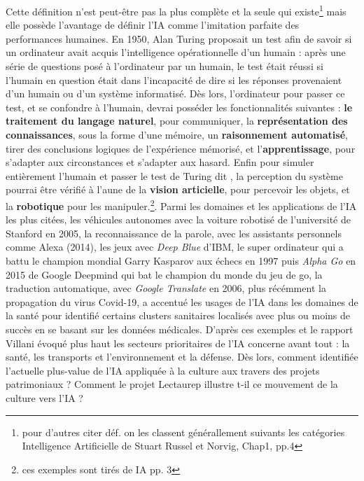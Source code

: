 Cette définition n'est peut-être pas la plus complète et la seule qui existe\footnote{ pour d'autres citer déf. on les classent générallement suivants les catégories Intelligence Artificielle de Stuart Russel et Norvig, Chap1, pp.4} mais elle possède l'avantage de définir l'IA comme l'imitation parfaite des performances humaines. En 1950, Alan Turing proposait un test afin de savoir si un ordinateur avait acquis l'intelligence opérationnelle d'un humain : après une série de questions posé à l'ordinateur par un humain, le test était réussi si l'humain en question était dans l'incapacité de dire si les réponses provenaient d'un humain ou d'un système informatisé. Dès lors, l'ordinateur pour passer ce test, et se confondre à l'humain, devrai posséder les fonctionnalités suivantes : \textbf{le traitement du langage naturel}, pour communiquer, la \textbf{représentation des connaissances}, sous la forme d'une mémoire, un \textbf{raisonnement automatisé}, tirer des conclusions logiques de l'expérience mémorisé, et l'\textbf{apprentissage}, pour s'adapter aux circonstances et s'adapter aux hasard. Enfin pour simuler entièrement l'humain et passer le test de Turing dit , la perception du système pourrai être vérifié à l'aune de la \textbf{vision articielle}, pour percevoir les objets, et la \textbf{robotique} pour les manipuler.\footnote{ces exemples sont tirés de IA pp. 3}. Parmi les domaines et les applications de l'IA les plus citées, les véhicules autonomes avec la voiture robotisé de l'université de Stanford en 2005, la reconnaissance de la parole, avec les assistants personnels comme Alexa (2014), les jeux avec \textit{Deep Blue} d'IBM, le super ordinateur qui a battu le champion mondial Garry Kasparov aux échecs en 1997 puis \textit{Alpha Go} en 2015 de Google Deepmind qui bat le champion du monde du jeu de go, la traduction automatique, avec \textit{Google Translate} en 2006, plus récémment la propagation du virus Covid-19, a accentué les usages de l'IA dans les domaines de la santé pour identifié certains clusters sanitaires localisés avec plus ou moins de succès en se basant sur les données médicales. D'après ces exemples et le rapport Villani évoqué plus haut les secteurs prioritaires de l'IA concerne avant tout : la santé, les transports et l'environnement et la défense. Dès lors, comment identifiée l'actuelle plus-value de l'IA appliquée à la culture aux travers des projets patrimoniaux ?  Comment le projet Lectaurep illustre t-il ce mouvement de la culture vers l'IA ? 
\bigskip


